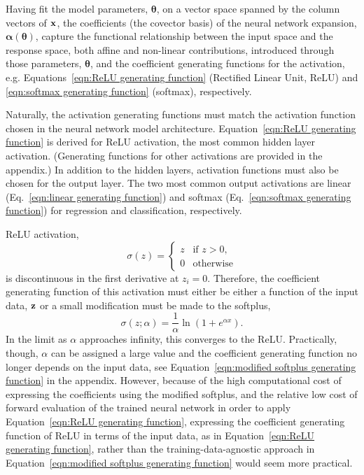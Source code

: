 Having fit the model parameters, $\boldsymbol{\theta}$, on a vector space spanned by the column vectors of ${\bf x}$, the coefficients (the covector basis) of the neural network expansion, $\boldsymbol{\alpha}(\boldsymbol{\theta})$, capture the functional relationship between the input space and the response space, both affine and non-linear contributions, introduced through those parameters, $\boldsymbol{\theta}$, and the coefficient generating functions for the activation, e.g. Equations~\ref{eqn:ReLU generating function} (Rectified Linear Unit, ReLU) and \ref{eqn:softmax generating function} (softmax), respectively.

Naturally, the activation generating functions must match the activation function chosen in the neural network model architecture. Equation~\ref{eqn:ReLU generating function} is derived for ReLU activation, the most common hidden layer activation. (Generating functions for other activations are provided in the appendix.) In addition to the hidden layers, activation functions must also be chosen for the output layer. The two most common output activations are linear (Eq.~\ref{eqn:linear generating function}) and softmax (Eq.~\ref{eqn:softmax generating function}) for regression and classification, respectively.

ReLU activation,
\[
    \sigma(z) = \begin{cases}
            z   & \mbox{if } z > 0, \\
            0   & \mbox{otherwise}
        \end{cases}
\]
is discontinuous in the first derivative at $z_i = 0$. Therefore, the coefficient generating function of this activation must either be either a function of the input data, ${\bf z}$ or a small modification must be made to the softplus,
\begin{equation}
    \sigma(z; \alpha) = \frac{1}{\alpha} \ln\left( 1 + e^{\alpha x} \right).
    \label{eqn:modified softmax}
\end{equation}
In the limit as $\alpha$ approaches infinity, this converges to the ReLU. Practically, though, $\alpha$ can be assigned a large value and the coefficient generating function no longer depends on the input data, see Equation~\ref{eqn:modified softplus generating function} in {\color{red} the appendix}. However, because of the high computational cost of expressing the coefficients using the modified softplus, and the relative low cost of forward evaluation of the trained neural network in order to apply Equation~\ref{eqn:ReLU generating function}, expressing the coefficient generating function of ReLU in terms of the input data, as in Equation~\ref{eqn:ReLU generating function}, rather than the training-data-agnostic approach in Equation~\ref{eqn:modified softplus generating function} would seem more practical.

